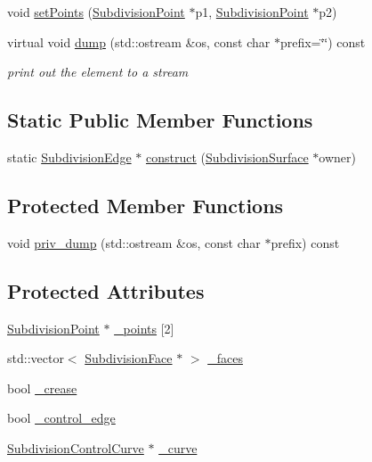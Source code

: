 \begin{DoxyCompactItemize}
void \hyperlink{classShipCAD_1_1SubdivisionEdge_ab86e4ccfa750684432c228ea2cc991ff}{set\-Points} (\hyperlink{classShipCAD_1_1SubdivisionPoint}{Subdivision\-Point} $\ast$p1, \hyperlink{classShipCAD_1_1SubdivisionPoint}{Subdivision\-Point} $\ast$p2)
\item 
virtual void \hyperlink{classShipCAD_1_1SubdivisionEdge_a14cc58877644ebd7b7ebffbdf8ef87f7}{dump} (std\-::ostream \&os, const char $\ast$prefix=\char`\"{}\char`\"{}) const 
\begin{DoxyCompactList}\small\item\em print out the element to a stream \end{DoxyCompactList}\end{DoxyCompactItemize}
\subsection*{Static Public Member Functions}
\begin{DoxyCompactItemize}
\item 
static \hyperlink{classShipCAD_1_1SubdivisionEdge}{Subdivision\-Edge} $\ast$ \hyperlink{classShipCAD_1_1SubdivisionEdge_ac2e94f4689d724a1d5b75c7f2619c37d}{construct} (\hyperlink{classShipCAD_1_1SubdivisionSurface}{Subdivision\-Surface} $\ast$owner)
\end{DoxyCompactItemize}
\subsection*{Protected Member Functions}
\begin{DoxyCompactItemize}
\item 
void \hyperlink{classShipCAD_1_1SubdivisionEdge_a8b33f4ae9edbd8ac4a386d9f5f5c1131}{priv\-\_\-dump} (std\-::ostream \&os, const char $\ast$prefix) const 
\end{DoxyCompactItemize}
\subsection*{Protected Attributes}
\begin{DoxyCompactItemize}
\item 
\hyperlink{classShipCAD_1_1SubdivisionPoint}{Subdivision\-Point} $\ast$ \hyperlink{classShipCAD_1_1SubdivisionEdge_a55519f9d615d6bd701c10c48259525ac}{\-\_\-points} \mbox{[}2\mbox{]}
\item 
std\-::vector$<$ \hyperlink{classShipCAD_1_1SubdivisionFace}{Subdivision\-Face} $\ast$ $>$ \hyperlink{classShipCAD_1_1SubdivisionEdge_aa1da730fcb3ac49c92e803a0b336d855}{\-\_\-faces}
\item 
bool \hyperlink{classShipCAD_1_1SubdivisionEdge_a9ea4714611e4970cf5e4014304a20190}{\-\_\-crease}
\item 
bool \hyperlink{classShipCAD_1_1SubdivisionEdge_ae933ee4901a7964ca50a83edad44e8ec}{\-\_\-control\-\_\-edge}
\item 
\hyperlink{classShipCAD_1_1SubdivisionControlCurve}{Subdivision\-Control\-Curve} $\ast$ \hyperlink{classShipCAD_1_1SubdivisionEdge_a1863a7ef84b2d73f0e1407f3536bbc9f}{\-\_\-curve}
\end{DoxyCompactItemize}



